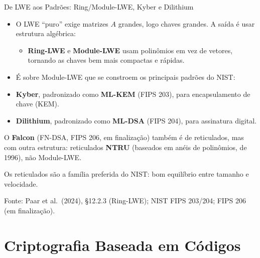 \documentclass{beamer}
\begin{document}
\begin{frame}{De LWE aos Padrões: Ring/Module-LWE, Kyber e Dilithium}
    \begin{itemize}
        \footnotesize
        \item O LWE ``puro'' exige matrizes $A$ grandes, logo chaves grandes. A saída é usar estrutura algébrica:
        \begin{itemize}
            \scriptsize
            \item \textbf{Ring-LWE} e \textbf{Module-LWE} usam polinômios em vez de vetores, tornando as chaves bem mais compactas e rápidas.
        \end{itemize}
        \item É sobre Module-LWE que se constroem os principais padrões do NIST:
    \end{itemize}
    \smallskip
    \begin{tcolorbox}[colback=green!6,colframe=green!50!black,boxrule=0.5pt]
        \footnotesize
        \begin{itemize}
            \item \textbf{Kyber}, padronizado como \textbf{ML-KEM} (FIPS 203), para encapsulamento de chave (KEM).
            \item \textbf{Dilithium}, padronizado como \textbf{ML-DSA} (FIPS 204), para assinatura digital.
        \end{itemize}
        \smallskip
        O \textbf{Falcon} (FN-DSA, FIPS 206, em finalização) também é de reticulados, mas com outra estrutura: reticulados \textbf{NTRU} (baseados em anéis de polinômios, de 1996), não Module-LWE.
    \end{tcolorbox}
    \vspace{-0.2em}
    \begin{tcolorbox}[colback=blue!5,colframe=blue!50!black,boxrule=0.5pt]
        \footnotesize
        Os reticulados são a família preferida do NIST: bom equilíbrio entre tamanho e velocidade.
    \end{tcolorbox}
    \vspace{-0.1em}
    {\tiny Fonte: Paar et al.\ (2024), §12.2.3 (Ring-LWE); NIST FIPS 203/204; FIPS 206 (em finalização).}
\end{frame}

\section{Criptografia Baseada em Códigos}
\end{document}
